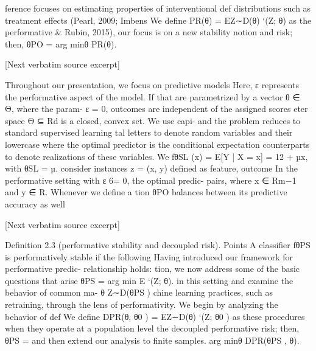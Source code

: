 \documentclass[10pt]{article}
\begin{document}
\begin{ReviewVerbatim}
ference focuses on estimating properties of interventional                          def
distributions such as treatment effects (Pearl, 2009; Imbens      We deﬁne PR(θ) = EZ∼D(θ) `(Z; θ) as the performative
& Rubin, 2015), our focus is on a new stability notion and        risk; then, θPO = arg minθ PR(θ).

[Next verbatim source excerpt]

Throughout our presentation, we focus on predictive models        Here, ε represents the performative aspect of the model. If
that are parametrized by a vector θ ∈ Θ, where the param-         ε = 0, outcomes are independent of the assigned scores
eter space Θ ⊆ Rd is a closed, convex set. We use capi-           and the problem reduces to standard supervised learning
tal letters to denote random variables and their lowercase        where the optimal predictor is the conditional expectation
counterparts to denote realizations of these variables. We        fθSL (x) = E[Y | X = x] = 12 + µx, with θSL = µ.
consider instances z = (x, y) deﬁned as feature, outcome          In the performative setting with ε 6= 0, the optimal predic-
pairs, where x ∈ Rm−1 and y ∈ R. Whenever we deﬁne a              tion θPO balances between its predictive accuracy as well

[Next verbatim source excerpt]

Deﬁnition 2.3 (performative stability and decoupled risk).              Points
A classiﬁer fθPS is performatively stable if the following           Having introduced our framework for performative predic-
relationship holds:                                                  tion, we now address some of the basic questions that arise
             θPS = arg min          E        `(Z; θ).                in this setting and examine the behavior of common ma-
                        θ        Z∼D(θPS )                           chine learning practices, such as retraining, through the lens
                                                                     of performativity. We begin by analyzing the behavior of
                                  def
We deﬁne DPR(θ, θ0 )     =    EZ∼D(θ) `(Z; θ0 ) as                   these procedures when they operate at a population level
the decoupled performative risk; then, θPS      =                    and then extend our analysis to ﬁnite samples.
arg minθ DPR(θPS , θ).
\end{ReviewVerbatim}
\end{document}
